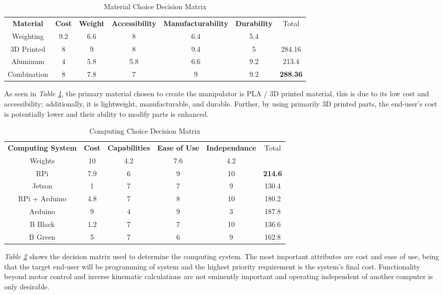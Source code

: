 \documentclass[12pt]{report}
\begin{document}
\begin{table}[htp]
  \center
  \caption{Material Choice Decision Matrix}
  \label{table:mat}
\small\begin{tabular}{c|cccccc}
\textbf{Material} & \textbf{Cost} & \textbf{Weight} & \textbf{Accessibility} & \textbf{Manufacturability} & \textbf{Durability} & Total \\\normalsize
Weighting & 9.2 & 6.6 & 8 & 6.4 & 5.4 & \\\hline
3D Printed & 8 & 9 & 8 & 9.4 & 5 & 284.16 \\
Aluminum & 4 & 5.8 & 5.8 & 6.6 & 9.2 & 213.4 \\
Combination & 8 & 7.8 & 7 & 9 & 9.2 & \textbf{288.36} \\
\end{tabular}
\end{table}
As seen in \emph{Table \ref{table:mat}}, the primary material chosen to create the manipulator is PLA / 3D printed material, this is due to its low cost and accessibility; additionally, it is lightweight, manufacturable, and durable. Further, by using primarily 3D printed parts, the end-user’s cost is potentially lower and their ability to modify parts is enhanced.
\newpage
\begin{table}[htp]
  \center
  \caption{Computing Choice Decision Matrix}
  \label{table:comp}
\begin{tabular}{c|ccccc}
\textbf{Computing System} & \textbf{Cost} & \textbf{Capabilities} & \textbf{Ease of Use} & \textbf{Independance} & Total \\
Weights & 10 & 4.2 & 7.6 & 4.2 & \\ \hline
RPi & 7.9 & 6 & 9 & 10 & \textbf{214.6} \\
Jetson & 1 & 7 & 7 & 9 & 130.4 \\
RPi + Arduino & 4.8 & 7 & 8 & 10 & 180.2 \\
Arduino & 9 & 4 & 9 & 3 & 187.8 \\
B Black & 1.2 & 7 & 7 & 10 & 136.6 \\
B Green & 5 & 7 & 6 & 9 & 162.8 \\
\end{tabular}
\end{table}

\emph{Table \ref{table:comp}} shows the decision matrix used to determine the computing system. The most important attributes are cost and ease of use, being that the target end-user will be programming of system and the highest priority requirement is the system's final cost. Functionality beyond motor control and inverse kinematic calculations are not eminently important and operating independent of another computer is only desirable.
\end{document}
